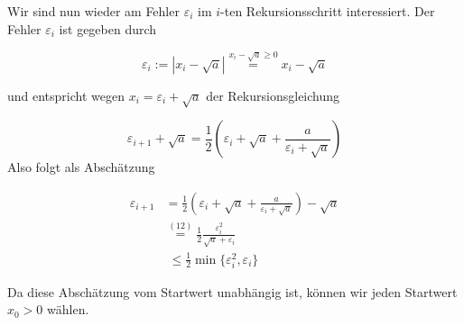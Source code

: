\documentclass[11pt,a4paper,ngerman]{article}
\begin{document}
Wir sind nun wieder am Fehler $\varepsilon_i$ im $i$-ten Rekursionsschritt interessiert. 
Der Fehler $\varepsilon_i$ ist gegeben durch

\begin{equation}
\varepsilon_i := |x_i - \sqrt{a}| \stackrel{x_i - \sqrt{a} \geq 0}{=} x_i - \sqrt{a}
\end{equation}

und entspricht wegen $x_i = \varepsilon_i + \sqrt{a}$
der Rekursionsgleichung

\begin{equation}
\varepsilon_{i+1} + \sqrt{a} = \frac{1}{2} \left(\varepsilon_i + \sqrt{a} + \frac{a}{\varepsilon_i + \sqrt{a}} \right)
\end{equation}
Also folgt als Abschätzung 

\begin{equation}\begin{split}
\varepsilon_{i+1} &=  \frac{1}{2} \left(\varepsilon_i + \sqrt{a} + \frac{a}{\varepsilon_i + \sqrt{a}} \right) - \sqrt{a} \\
  &\stackrel{(12)}{=} \frac{1}{2} \frac{\varepsilon_i^2}{\sqrt{a} + \varepsilon_i} \\
  &\; \leq \frac{1}{2} \min \{\varepsilon_i^2, \varepsilon_i \}
\end{split}\end{equation}

Da diese Abschätzung vom Startwert unabhängig ist, können wir jeden Startwert $x_0 > 0$ wählen. 


\label{LastPage}
\end{document}
